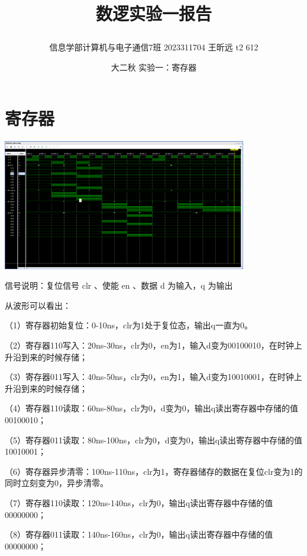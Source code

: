 \documentclass{article} %
\begin{document}
    \title{\centerline{数逻实验一报告}}
    \date{大二秋 实验一：寄存器}
    \author{信息学部计算机与电子通信7班 2023311704 王昕远 t2 612}
    \maketitle
    \thispagestyle{empty}


\section{寄存器}
\includegraphics[width=0.8\textwidth]{1.png}\par
信号说明：复位信号 clr 、使能 en 、数据 d 为输入，q 为输出\par
从波形可以看出：\par

（1）寄存器初始复位：0-10ns，clr为1处于复位态，输出q一直为0。\par

（2）寄存器110写入：20ns-30ns，clr为0，en为1，输入d变为00100010，在时钟上升沿到来的时候存储；\par
（3）寄存器011写入：40ns-50ns，clr为0，en为1，输入d变为10010001，在时钟上升沿到来的时候存储；\par

（4）寄存器110读取：60ns-80ns，clr为0，d变为0，输出q读出寄存器中存储的值00100010；\par
（5）寄存器011读取：80ns-100ns，clr为0，d变为0，输出q读出寄存器中存储的值10010001；\par
（6）寄存器异步清零：100ns-110ns，clr为1，寄存器储存的数据在复位clr变为1的同时立刻变为0，异步清零。\par

（7）寄存器110读取：120ns-140ns，clr为0，输出q读出寄存器中存储的值00000000；\par
（8）寄存器011读取：140ns-160ns，clr为0，输出q读出寄存器中存储的值00000000；\par
\end{document}
